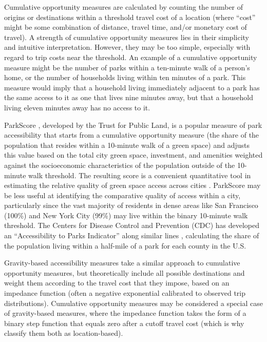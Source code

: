 \documentclass[3p, authoryear, review]{elsarticle} %
\begin{document}
Cumulative opportunity measures are calculated by counting the number of origins
or destinations within a threshold travel cost of a location (where ``cost'' might
be some combination of distance, travel time, and/or monetary cost of travel). A
strength of cumulative opportunity measures lies in their simplicity and
intuitive interpretation. However, they may be too simple, especially with
regard to trip costs near the threshold. An example of a cumulative opportunity
measure might be the number of parks within a ten-minute walk of a person's
home, or the number of households living within ten minutes of a park. This
measure would imply that a household living immediately adjacent to a park has
the same access to it as one that lives nine minutes away, but that a household
living eleven minutes away has no access to it.

ParkScore \citep{parkscore2019}, developed by the Trust for Public Land, is a popular
measure of park accessibility that starts from a cumulative opportunity measure
(the share of the population that resides within a 10-minute walk of a green
space) and adjusts this value based on the total city green space, investment,
and amenities weighted against the socioeconomic characteristics of the
population outside of the 10-minute walk threshold. The resulting score is a
convenient quantitative tool in estimating the relative quality of green space
access across cities \citep{Rigolon2018}. ParkScore may be less useful at identifying
the comparative quality of access within a city, particularly since the vast
majority of residents in dense areas like San Francisco (100\%) and New York City
(99\%) may live within the binary 10-minute walk threshold. The Centers for
Disease Control and Prevention (CDC) has developed an ``Accessibility to Parks
Indicator'' along similar lines \citep{Ussery2016}, calculating the share of the
population living within a half-mile of a park for each county in the U.S.

Gravity-based accessibility measures take a similar approach to cumulative
opportunity measures, but theoretically include all possible destinations and
weight them according to the travel cost that they impose, based on an impedance
function (often a negative exponential calibrated to observed trip
distributions). Cumulative opportunity measures may be considered a special case
of gravity-based measures, where the impedance function takes the form of a
binary step function that equals zero after a cutoff travel cost (which is why
\citet{GEURS2004127} classify them both as location-based).
\end{document}
